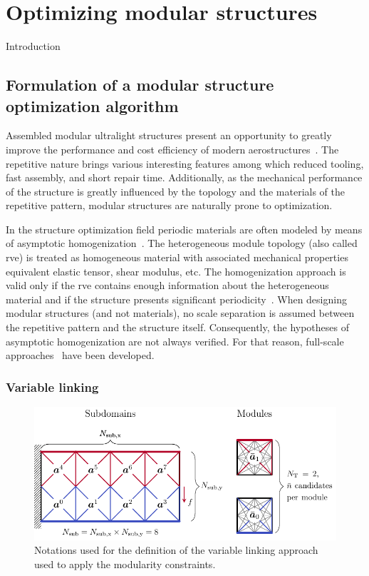 \setchapterpreamble[u]{\margintoc}
\glsresetall %
\chapter{Optimizing modular structures}
Introduction
\section{Formulation of a modular structure optimization algorithm}
Assembled modular ultralight structures present an opportunity to greatly improve the performance and cost efficiency of modern aerostructures~. The repetitive nature brings various interesting features among which reduced tooling, fast assembly, and short repair time. Additionally, as the mechanical performance of the structure is greatly influenced by the topology and the materials of the repetitive pattern, modular structures are naturally prone to optimization.

In the structure optimization field periodic materials are often modeled by means of asymptotic homogenization~. The heterogeneous module topology (also called \gls{rve}) is treated as homogeneous material with associated mechanical properties \ie equivalent elastic tensor, shear modulus, etc. The homogenization approach is valid only if the \gls{rve} contains enough information about the heterogeneous material and if the structure presents significant periodicity~. When designing modular structures (and not materials), no scale separation is assumed between the repetitive pattern and the structure itself. Consequently, the hypotheses of asymptotic homogenization are not always verified. For that reason, full-scale approaches~ have been developed.

\subsection{Variable linking}
\begin{figure}
    \centering
    \includegraphics{figures/05_cellular_opt/00_modules_VL_bc/modules_bc.pdf}
    \caption{Notations used for the definition of the variable linking approach used to apply the modularity constraints.}
    \label{fig:05_VL}
\end{figure}

